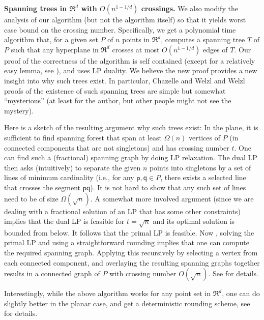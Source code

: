 \documentclass[12pt]{article}
\newcommand{\PntSet}{P}
\newcommand{\pnt}{\mathsf{p}}
\newcommand{\pntA}{\mathsf{q}}
\newcommand{\Term}[1]{\textsf{#1}}
\newcommand{\LP}{\Term{L{}P}\xspace}
\begin{document}
\medskip
\noindent
\textbf{Spanning trees in $\Re^d$ with $O(n^{1-1/d})$ crossings.}  We
also modify the analysis of our algorithm (but not the algorithm
itself) so that it yields worst case bound on the crossing number.
Specifically, we get a polynomial time algorithm that, for a given set
$\PntSet$ of $n$ points in $\Re^d$, computes a spanning tree $T$ of
$\PntSet$ such that any hyperplane in $\Re^d$ crosses at most
$O(n^{1-1/d})$ edges of $T$.  Our proof of the correctness of the
algorithm is self contained (except for a relatively easy lemma, see
), and uses \LP duality. We believe the new
proof provides a new insight into why such trees exist. In particular,
Chazelle and Welzl \cite{cw-qorss-89} and Welzl \cite{w-stlcn-92}
proofs of the existence of such spanning trees are simple but somewhat
``mysterious'' (at least for the author, but other people might not
see the mystery).

Here is a sketch of the resulting argument why such trees exist: In
the plane, it is sufficient to find spanning forest that span at least
$\Omega(n)$ vertices of $\PntSet$ (in connected components that are
not singletons) and has crossing number $t$.  One can find such a
(fractional) spanning graph by doing \LP relaxation. The dual \LP then
asks (intuitively) to separate the given $n$ points into singletons by
a set of lines of minimum cardinality (i.e., for any $\pnt, \pntA \in
\PntSet$, there exists a selected line that crosses the segment
$\pnt\pntA$). It is not hard to show that any such set of lines need
to be of size $\Omega(\sqrt{n})$. A somewhat more involved argument
(since we are dealing with a fractional solution of an \LP that has
some other constraints) implies that the dual \LP is feasible for $t =
\sqrt{n}$ and its optimal solution is bounded from below. It follows
that the primal \LP is feasible. Now
, solving the primal \LP and using
a straightforward rounding implies that one can compute the required
spanning graph. Applying this recursively by selecting a vertex from
each connected component, and overlaying the resulting spanning graphs
together results in a connected graph of $\PntSet$ with crossing
number $O(\sqrt{n})$.  See  for details.

Interestingly, while the above algorithm works for any point set in
$\Re^d$, one can do slightly better in the planar case, and get a
deterministic rounding scheme, see  for details.



\medskip
\end{document}
